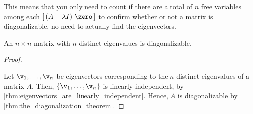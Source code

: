 \begin{note}
  \label{nte:n_free_variables}

  This means that you only need to count if there are a total of $n$ free
  variables among each $[\,(A-\lambda I)~\zero\,]$ to confirm whether or not a
  matrix is diagonalizable, no need to actually find the eigenvectors.
\end{note}

\begin{theorem}
  \label{thm:diagonalizable_matrix_with_n_distinct_eigenvalues}

  An $n \times n$ matrix with $n$ distinct eigenvalues is diagonalizable.
\end{theorem}

\begin{proof}
  \label{prf:diagonalizable_matrix_with_n_distinct_eigenvalues}

  Let $\v_1, \dots, \v_n$ be eigenvectors corresponding to the $n$ distinct
  eigenvalues of a matrix $A$. Then, $\left\{\v_1, \dots, \v_n\right\}$ is
  linearly independent, by \cref{thm:eigenvectors_are_linearly_independent}.
  Hence, $A$ is diagonalizable by \cref{thm:the_diagonalization_theorem}.
\end{proof}


\newpage
